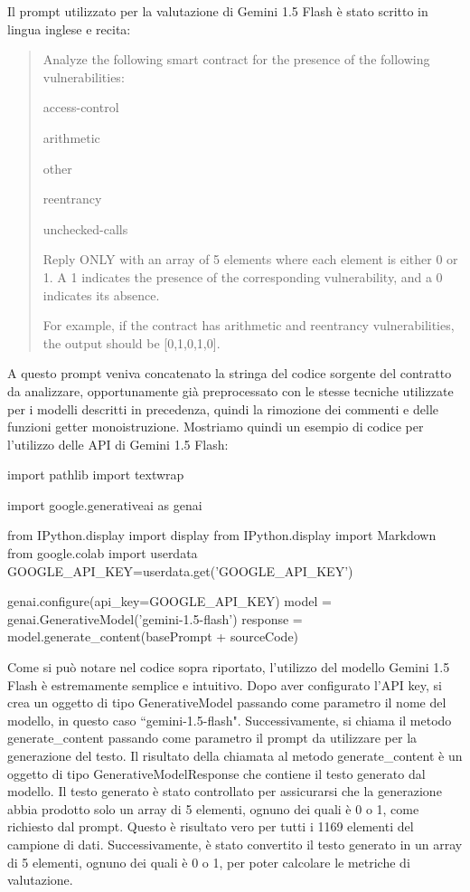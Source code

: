 \documentclass[../../Thesis.tex]{subfiles}
\begin{document}
Il prompt utilizzato per la valutazione di Gemini 1.5 Flash \`e stato scritto in lingua inglese e recita: 

\begin{quote}
Analyze the following smart contract for the presence of the following vulnerabilities:

access-control 

arithmetic

other

reentrancy

unchecked-calls

Reply ONLY with an array of 5 elements where each element is either 0 or 1. A 1 indicates the presence of the corresponding vulnerability, and a 0 indicates its absence.

For example, if the contract has arithmetic and reentrancy vulnerabilities, the output should be [0,1,0,1,0].
\end{quote}   
A questo prompt veniva concatenato la stringa del codice sorgente del contratto da analizzare, opportunamente gi\`a preprocessato con le stesse tecniche utilizzate per i modelli descritti in precedenza, quindi la rimozione dei commenti e delle funzioni getter monoistruzione. Mostriamo quindi un esempio di codice per l'utilizzo delle API di Gemini 1.5 Flash:
\begin{python}
import pathlib
import textwrap

import google.generativeai as genai

from IPython.display import display
from IPython.display import Markdown
from google.colab import userdata
GOOGLE_API_KEY=userdata.get('GOOGLE_API_KEY')

genai.configure(api_key=GOOGLE_API_KEY)
model = genai.GenerativeModel('gemini-1.5-flash')
response = model.generate_content(basePrompt + sourceCode)
\end{python}

Come si pu\`o notare nel codice sopra riportato, l'utilizzo del modello Gemini 1.5 Flash \`e estremamente semplice e intuitivo. Dopo aver configurato l'API key, si crea un oggetto di tipo GenerativeModel passando come parametro il nome del modello, in questo caso ``gemini-1.5-flash". Successivamente, si chiama il metodo generate\_content passando come parametro il prompt da utilizzare per la generazione del testo. Il risultato della chiamata al metodo generate\_content \`e un oggetto di tipo GenerativeModelResponse che contiene il testo generato dal modello. 
Il testo generato \`e stato controllato per assicurarsi che la generazione abbia prodotto solo un array di 5 elementi, ognuno dei quali \`e 0 o 1, come richiesto dal prompt. Questo \`e risultato vero per tutti i 1169 elementi del campione di dati. Successivamente, \`e stato convertito il testo generato in un array di 5 elementi, ognuno dei quali \`e 0 o 1, per poter calcolare le metriche di valutazione.
\end{document}
